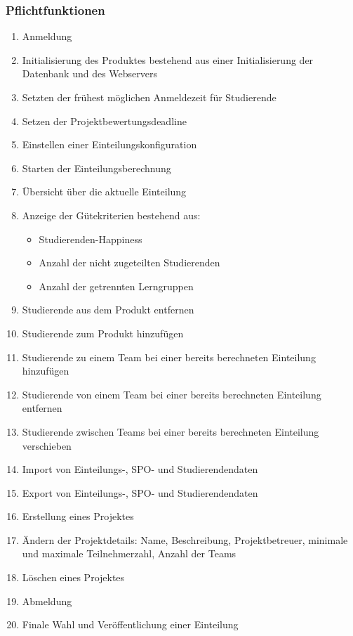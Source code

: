 \documentclass[parskip=full]{scrartcl}
\newcommand{\swtLabel}[1]{\textbf{/#1\arabic*0/}}
\begin{document}
\subsubsection{Pflichtfunktionen}
\begin{enumerate}[label=\swtLabel{FA}, resume]
  \item Anmeldung
  \item Initialisierung des Produktes bestehend aus einer Initialisierung der Datenbank
und des Webservers
\item Setzten der frühest möglichen Anmeldezeit für Studierende
\item Setzen der Projektbewertungsdeadline
\item Einstellen einer Einteilungskonfiguration
\item Starten der Einteilungsberechnung
\item Übersicht über die aktuelle Einteilung
\item Anzeige der Gütekriterien bestehend aus:
\begin{itemize}
  \item Studierenden-Happiness
  \item Anzahl der nicht zugeteilten Studierenden
  \item Anzahl der getrennten Lerngruppen
\end{itemize}
\item Studierende aus dem Produkt entfernen
\item Studierende zum Produkt hinzufügen
\item Studierende zu einem Team bei einer bereits berechneten Einteilung
hinzufügen
\item Studierende von einem Team bei einer bereits berechneten Einteilung
entfernen
\item Studierende zwischen Teams bei einer bereits berechneten Einteilung verschieben
\item Import von Einteilungs-, SPO- und Studierendendaten
\item Export von Einteilungs-, SPO- und Studierendendaten
\item Erstellung eines Projektes
\item Ändern der Projektdetails: Name, Beschreibung, Projektbetreuer, minimale
und maximale Teilnehmerzahl, Anzahl der Teams
\item Löschen eines Projektes
\item Abmeldung
\item Finale Wahl und Veröffentlichung einer Einteilung
\end{enumerate}
\end{document}
